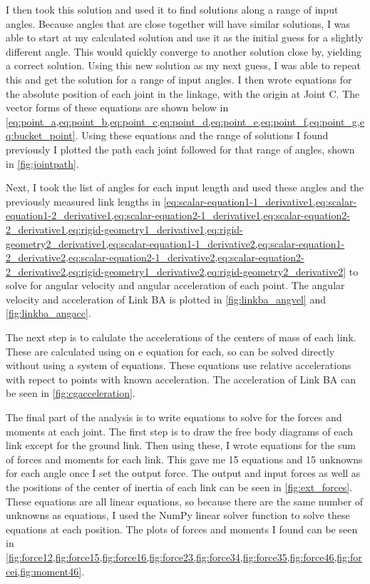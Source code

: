 \documentclass[hidelinks]{article}
\begin{document}
    I then took this solution and used it to find solutions along a range of input angles. Because angles that are close together will have similar solutions, I was able to start at my calculated solution and use it as the initial guess for a slightly different angle. This would quickly converge to another solution close by, yielding a correct solution. Using this new solution as my next guess, I was able to repeat this and get the solution for a range of input angles. I then wrote equations for the absolute position of each joint in the linkage, with the origin at Joint C. The vector forms of these equations are shown below in \cref{eq:point_a,eq:point_b,eq:point_c,eq:point_d,eq:point_e,eq:point_f,eq:point_g,eq:bucket_point}. Using these equations and the range of solutions I found previously I plotted the path each joint followed for that range of angles, shown in \autoref{fig:jointpath}.

    Next, I took the list of angles for each input length and used these angles and the previously measured link lengths in \cref{eq:scalar-equation1-1_derivative1,eq:scalar-equation1-2_derivative1,eq:scalar-equation2-1_derivative1,eq:scalar-equation2-2_derivative1,eq:rigid-geometry1_derivative1,eq:rigid-geometry2_derivative1,eq:scalar-equation1-1_derivative2,eq:scalar-equation1-2_derivative2,eq:scalar-equation2-1_derivative2,eq:scalar-equation2-2_derivative2,eq:rigid-geometry1_derivative2,eq:rigid-geometry2_derivative2} to solve for angular velocity and angular acceleration of each point. The angular velocity and acceleration of Link BA is plotted in \autoref{fig:linkba_angvel} and \autoref{fig:linkba_angacc}.

    The next step is to calulate the accelerations of the centers of mass of each link. These are calculated using on e equation for each, so can be solved directly without using a system of equations. These equations use relative accelerations with repect to points with known acceleration. The acceleration of Link BA can be seen in \autoref{fig:cgacceleration}.

    The final part of the analysis is to write equations to solve for the forces and moments at each joint. The first step is to draw the free body diagrams of each link except for the ground link. Then using these, I wrote equations for the sum of forces and moments for each link. This gave me 15 equations and 15 unknowns for each angle once I set the output force. The output and input forces as well as the positions of the center of inertia of each link can be seen in \autoref{fig:ext_forces}. These equations are all linear equations, so because there are the same number of unknowns as equations, I used the NumPy linear solver function to solve these equations at each position. The plots of forces and moments I found can be seen in \cref{fig:force12,fig:force15,fig:force16,fig:force23,fig:force34,fig:force35,fig:force46,fig:forcei,fig:moment46}.
    
\end{document}
